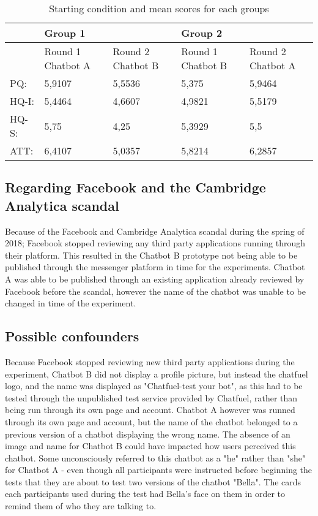 \begin{table}[H]
\centering
\begin{tabular}{lll|ll}
\hline
& Group 1 &  & Group 2 &  \\
\hline
& Round 1 Chatbot A & Round 2 Chatbot B & Round 1 Chatbot B & Round 2 Chatbot A \\
\hline
PQ: & 5,9107 & 5,5536 & 5,375 & 5,9464 \\
HQ-I: & 5,4464 & 4,6607 & 4,9821 & 5,5179 \\
HQ-S: & 5,75 & 4,25 & 5,3929 & 5,5 \\
ATT: & 6,4107 & 5,0357 & 5,8214 & 6,2857 \\
\end{tabular}
\caption{Starting condition and mean scores for each groups}
    \label{tab:my_label}
\end{table}


\subsection{Regarding Facebook and the Cambridge Analytica scandal}

Because of the Facebook and Cambridge Analytica scandal during the spring of 2018; Facebook stopped reviewing any third party applications running through their platform. This resulted in the Chatbot B prototype not being able to be published through the messenger platform in time for the experiments. Chatbot A was able to be published through an existing application already reviewed by Facebook before the scandal, however the name of the chatbot was unable to be changed in time of the experiment.

\subsection{Possible confounders}
Because Facebook stopped reviewing new third party applications during the experiment, Chatbot B did not display a profile picture, but instead the chatfuel logo, and the name was displayed as "Chatfuel-test your bot", as this had to be tested through the unpublished test service provided by Chatfuel, rather than being run through its own page and account. Chatbot A however was runned through its own page and account, but the name of the chatbot belonged to a previous version of a chatbot displaying the wrong name. The absence of an image and name for Chatbot B could have impacted how users perceived this chatbot. Some unconsciously referred to this chatbot as a "he" rather than "she" for Chatbot A - even though all participants were instructed before beginning the tests that they are about to test two versions of the chatbot "Bella". The cards each participants used during the test had Bella's face on them in order to remind them of who they are talking to. 


